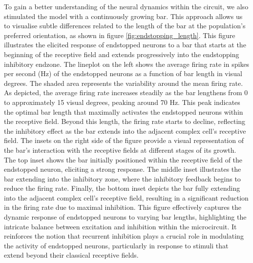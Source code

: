 \documentclass[12pt]{article}
\begin{document}
To gain a better understanding of the neural dynamics within the circuit, we also stimulated the model with a continuously growing bar. This approach allows us to visualise subtle differences related to the length of the bar at the population's preferred orientation, as shown in figure \ref{fig:endstopping_length}. This figure illustrates the elicited response of endstopped neurons to a bar that starts at the beginning of the receptive field and extends progressively into the endstopping inhibitory endzone. The lineplot on the left shows the average firing rate in spikes per second (Hz) of the endstopped neurons as a function of bar length in visual degrees. The shaded area represents the variability around the mean firing rate. As depicted, the average firing rate increases steadily as the bar lengthens from 0 to approximately 15 visual degrees, peaking around 70 Hz. This peak indicates the optimal bar length that maximally activates the endstopped neurons within the receptive field. Beyond this length, the firing rate starts to decline, reflecting the inhibitory effect as the bar extends into the adjacent complex cell's receptive field.
\bigbreak
The insets on the right side of the figure provide a visual representation of the bar's interaction with the receptive fields at different stages of its growth. The top inset shows the bar initially positioned within the receptive field of the endstopped neuron, eliciting a strong response. The middle inset illustrates the bar extending into the inhibitory zone, where the inhibitory feedback begins to reduce the firing rate. Finally, the bottom inset depicts the bar fully extending into the adjacent complex cell's receptive field, resulting in a significant reduction in the firing rate due to maximal inhibition. This figure effectively captures the dynamic response of endstopped neurons to varying bar lengths, highlighting the intricate balance between excitation and inhibition within the microcircuit. It reinforces the notion that recurrent inhibition plays a crucial role in modulating the activity of endstopped neurons, particularly in response to stimuli that extend beyond their classical receptive fields.
\end{document}
